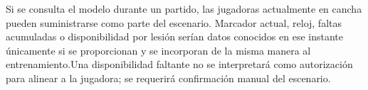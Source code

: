 Si se consulta el modelo durante un partido, las jugadoras actualmente en cancha pueden suministrarse como parte del escenario. Marcador actual, reloj, faltas acumuladas o disponibilidad por lesión serían datos conocidos en ese instante únicamente si se proporcionan y se incorporan de la misma manera al entrenamiento.Una disponibilidad faltante no se interpretará como autorización para alinear a la jugadora; se requerirá confirmación manual del escenario.
